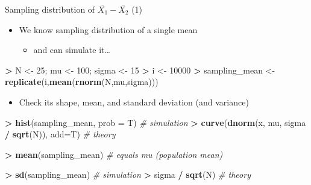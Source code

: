 \documentclass[
  ignorenonframetext,
]{beamer}
\newenvironment{Shaded}{\begin{snugshade}}{\end{snugshade}}
\newcommand{\AttributeTok}[1]{\textcolor[rgb]{0.13,0.29,0.53}{#1}}
\newcommand{\CommentTok}[1]{\textcolor[rgb]{0.56,0.35,0.01}{\textit{#1}}}
\newcommand{\DecValTok}[1]{\textcolor[rgb]{0.00,0.00,0.81}{#1}}
\newcommand{\FunctionTok}[1]{\textcolor[rgb]{0.13,0.29,0.53}{\textbf{#1}}}
\newcommand{\NormalTok}[1]{#1}
\newcommand{\OtherTok}[1]{\textcolor[rgb]{0.56,0.35,0.01}{#1}}
\newcommand{\SpecialCharTok}[1]{\textcolor[rgb]{0.81,0.36,0.00}{\textbf{#1}}}
\providecommand{\tightlist}{%
  \setlength{\itemsep}{0pt}\setlength{\parskip}{0pt}}
\begin{document}
\begin{frame}[fragile]{Sampling distribution of
\(\bar{X_1} - \bar{X_2}\) (1)}
\label{sampling-distribution-of-barx_1---barx_2-1}
\begin{itemize}
\tightlist
\item
  We know sampling distribution of a single mean

  \begin{itemize}
  \tightlist
  \item
    and can simulate it\ldots{}
  \end{itemize}
\end{itemize}

\begin{Shaded}
\begin{Highlighting}[]
\SpecialCharTok{\textgreater{}}\NormalTok{ N }\OtherTok{\textless{}{-}} \DecValTok{25}\NormalTok{; mu }\OtherTok{\textless{}{-}} \DecValTok{100}\NormalTok{; sigma }\OtherTok{\textless{}{-}} \DecValTok{15}
\SpecialCharTok{\textgreater{}}\NormalTok{ i }\OtherTok{\textless{}{-}} \DecValTok{10000}
\SpecialCharTok{\textgreater{}}\NormalTok{ sampling\_mean }\OtherTok{\textless{}{-}} \FunctionTok{replicate}\NormalTok{(i,}\FunctionTok{mean}\NormalTok{(}\FunctionTok{rnorm}\NormalTok{(N,mu,sigma)))}
\end{Highlighting}
\end{Shaded}

\begin{itemize}
\tightlist
\item
  Check its shape, mean, and standard deviation (and variance)
\end{itemize}

\begin{Shaded}
\begin{Highlighting}[]
\SpecialCharTok{\textgreater{}} \FunctionTok{hist}\NormalTok{(sampling\_mean, }\AttributeTok{prob =}\NormalTok{ T) }\CommentTok{\# simulation}
\SpecialCharTok{\textgreater{}} \FunctionTok{curve}\NormalTok{(}\FunctionTok{dnorm}\NormalTok{(x, mu, sigma }\SpecialCharTok{/} \FunctionTok{sqrt}\NormalTok{(N)), }\AttributeTok{add=}\NormalTok{T) }\CommentTok{\# theory}
\end{Highlighting}
\end{Shaded}

\begin{Shaded}
\begin{Highlighting}[]
\SpecialCharTok{\textgreater{}} \FunctionTok{mean}\NormalTok{(sampling\_mean) }\CommentTok{\# equals mu (population mean)}
\end{Highlighting}
\end{Shaded}

\begin{Shaded}
\begin{Highlighting}[]
\SpecialCharTok{\textgreater{}} \FunctionTok{sd}\NormalTok{(sampling\_mean) }\CommentTok{\# simulation}
\SpecialCharTok{\textgreater{}}\NormalTok{ sigma }\SpecialCharTok{/} \FunctionTok{sqrt}\NormalTok{(N) }\CommentTok{\# theory}
\end{Highlighting}
\end{Shaded}
\end{frame}
\end{document}
